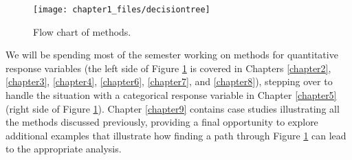 \documentclass[
]{book}
\begin{document}
\begin{figure}[ht!]

{\centering \texttt{[image: chapter1\_files/decisiontree]} 

}

\caption{Flow chart of methods.}\label{fig:Figure1-1}
\end{figure}

\indent We will be spending most of the semester working on methods for quantitative
response variables (the
left side of Figure \ref{fig:Figure1-1} is covered in Chapters \ref{chapter2},
\ref{chapter3}, \ref{chapter4}, \ref{chapter6}, \ref{chapter7}, and
\ref{chapter8}), stepping
over to handle the situation with a categorical response variable in Chapter \ref{chapter5} (right side
of Figure \ref{fig:Figure1-1}).
Chapter \ref{chapter9} contains case studies
illustrating all the methods discussed previously, providing a final opportunity
to explore additional examples that illustrate how finding a
path through Figure \ref{fig:Figure1-1} can lead to the appropriate analysis.
\end{document}
